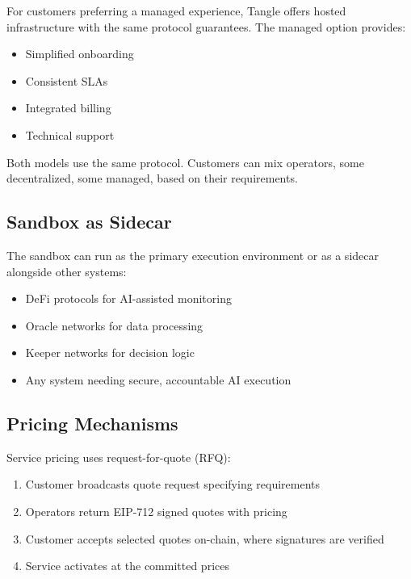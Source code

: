 \documentclass[11pt,a4paper]{article}
\begin{document}
For customers preferring a managed experience, Tangle offers hosted infrastructure with the same protocol guarantees. The managed option provides:

\begin{itemize}[noitemsep]
    \item Simplified onboarding
    \item Consistent SLAs
    \item Integrated billing
    \item Technical support
\end{itemize}

Both models use the same protocol. Customers can mix operators, some decentralized, some managed, based on their requirements.

\subsection{Sandbox as Sidecar}

The sandbox can run as the primary execution environment or as a sidecar alongside other systems:

\begin{itemize}[noitemsep]
    \item DeFi protocols for AI-assisted monitoring
    \item Oracle networks for data processing
    \item Keeper networks for decision logic
    \item Any system needing secure, accountable AI execution
\end{itemize}

\subsection{Pricing Mechanisms}

Service pricing uses request-for-quote (RFQ):

\begin{enumerate}[noitemsep]
    \item Customer broadcasts quote request specifying requirements
    \item Operators return EIP-712 signed quotes with pricing
    \item Customer accepts selected quotes on-chain, where signatures are verified
    \item Service activates at the committed prices
\end{enumerate}
\end{document}
